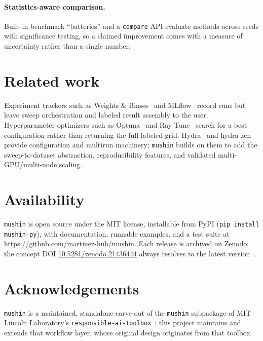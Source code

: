 \documentclass[11pt]{article}
\begin{document}
\paragraph{Statistics-aware comparison.}
Built-in benchmark ``batteries'' and a \texttt{compare} API evaluate methods
across seeds with significance testing, so a claimed improvement comes with a
measure of uncertainty rather than a single number.

\section{Related work}

Experiment trackers such as Weights \& Biases~\citep{biewald2020wandb} and
MLflow~\citep{mlflow2018} record runs but leave sweep orchestration and labeled
result assembly to the user. Hyperparameter optimizers such as
Optuna~\citep{akiba2019optuna} and Ray Tune~\citep{liaw2018tune} search for a best
configuration rather than returning the full labeled grid. Hydra~\citep{yadan2019hydra}
and hydra-zen~\citep{hydrazen2022} provide configuration and multirun machinery;
\texttt{mushin} builds on them to add the sweep-to-dataset abstraction,
reproducibility features, and validated multi-GPU/multi-node scaling.

\section{Availability}

\texttt{mushin} is open source under the MIT license, installable from PyPI
(\texttt{pip install mushin-py}), with documentation, runnable examples, and a
test suite at \url{https://github.com/martinez-hub/mushin}. Each release is
archived on Zenodo; the concept DOI
\href{https://doi.org/10.5281/zenodo.21436444}{10.5281/zenodo.21436444} always
resolves to the latest version~\citep{mushin_zenodo}.

\section*{Acknowledgements}

\texttt{mushin} is a maintained, standalone carve-out of the \texttt{mushin}
subpackage of MIT Lincoln Laboratory's
\texttt{responsible-ai-toolbox}~\citep{raitoolbox2021}; this project maintains and
extends that workflow layer, whose original design originates from that toolbox.



\end{document}
